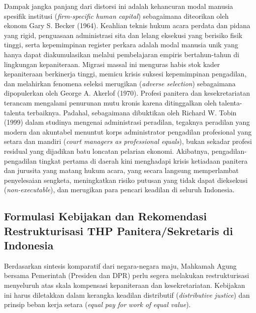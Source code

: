 \documentclass[12pt, a4paper]{article}
\begin{document}
Dampak jangka panjang dari distorsi ini adalah kehancuran modal manusia spesifik institusi (\textit{firm-specific human capital}) sebagaimana diteorikan oleh ekonom Gary S. Becker (1964). Keahlian teknis hukum acara perdata dan pidana yang rigid, penguasaan administrasi sita dan lelang eksekusi yang berisiko fisik tinggi, serta kepemimpinan register perkara adalah modal manusia unik yang hanya dapat diakumulasikan melalui pembelajaran empiris bertahun-tahun di lingkungan kepaniteraan. Migrasi massal ini menguras habis stok kader kepaniteraan berkinerja tinggi, memicu krisis suksesi kepemimpinan pengadilan, dan melahirkan fenomena seleksi merugikan (\textit{adverse selection}) sebagaimana dipopulerkan oleh George A. Akerlof (1970). Profesi panitera dan kesekretariatan terancam mengalami penurunan mutu kronis karena ditinggalkan oleh talenta-talenta terbaiknya. Padahal, sebagaimana dibuktikan oleh Richard W. Tobin (1999) dalam studinya mengenai administrasi peradilan, tegaknya peradilan yang modern dan akuntabel menuntut korps administrator pengadilan profesional yang setara dan mandiri (\textit{court managers as professional equals}), bukan sekadar profesi residual yang dijadikan batu loncatan pelarian ekonomi. Akibatnya, pengadilan-pengadilan tingkat pertama di daerah kini menghadapi krisis ketiadaan panitera dan jurusita yang matang hukum acara, yang secara langsung memperlambat penyelesaian sengketa, meningkatkan risiko putusan yang tidak dapat dieksekusi (\textit{non-executable}), dan merugikan para pencari keadilan di seluruh Indonesia.

\subsection{Formulasi Kebijakan dan Rekomendasi Restrukturisasi THP Panitera/Sekretaris di Indonesia}

Berdasarkan sintesis komparatif dari negara-negara maju, Mahkamah Agung bersama Pemerintah (Presiden dan DPR) perlu segera melakukan restrukturisasi menyeluruh atas skala kompensasi kepaniteraan dan kesekretariatan. Kebijakan ini harus diletakkan dalam kerangka keadilan distributif (\textit{distributive justice}) dan prinsip beban kerja setara (\textit{equal pay for work of equal value}).
\end{document}
